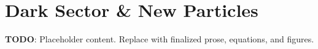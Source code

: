 
\section{Dark Sector & New Particles}
\label{sec:dark-sector-new-particles}

\textbf{TODO}: Placeholder content. Replace with finalized prose, equations, and figures.

